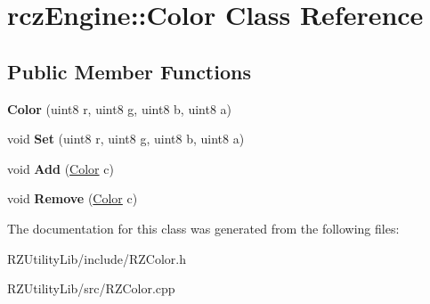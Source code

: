 \hypertarget{classrcz_engine_1_1_color}{}\section{rcz\+Engine\+:\+:Color Class Reference}
\label{classrcz_engine_1_1_color}
\subsection*{Public Member Functions}
\begin{DoxyCompactItemize}
\item 
\hypertarget{classrcz_engine_1_1_color_ae0a7c02f5836daf2e39439605ebf1c40}{}{\bfseries Color} (uint8 r, uint8 g, uint8 b, uint8 a)\label{classrcz_engine_1_1_color_ae0a7c02f5836daf2e39439605ebf1c40}

\item 
\hypertarget{classrcz_engine_1_1_color_ad53f5b1b8c322d4205d7294dbe426f45}{}void {\bfseries Set} (uint8 r, uint8 g, uint8 b, uint8 a)\label{classrcz_engine_1_1_color_ad53f5b1b8c322d4205d7294dbe426f45}

\item 
\hypertarget{classrcz_engine_1_1_color_a126452f86d441ffdf452b37ef3334823}{}void {\bfseries Add} (\hyperlink{classrcz_engine_1_1_color}{Color} c)\label{classrcz_engine_1_1_color_a126452f86d441ffdf452b37ef3334823}

\item 
\hypertarget{classrcz_engine_1_1_color_aa3dfa7b2879b5455ceb6244dc11bb379}{}void {\bfseries Remove} (\hyperlink{classrcz_engine_1_1_color}{Color} c)\label{classrcz_engine_1_1_color_aa3dfa7b2879b5455ceb6244dc11bb379}

\end{DoxyCompactItemize}


The documentation for this class was generated from the following files\+:\begin{DoxyCompactItemize}
\item 
R\+Z\+Utility\+Lib/include/R\+Z\+Color.\+h\item 
R\+Z\+Utility\+Lib/src/R\+Z\+Color.\+cpp\end{DoxyCompactItemize}
